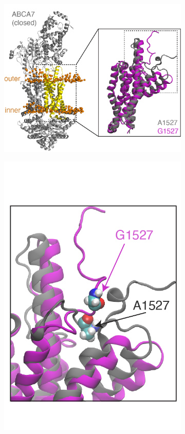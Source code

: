 \begin{figure}[H]
\begin{subfigure}[t]{0.3\textwidth}
        \includegraphics[width=\textwidth]{./main_plots/abca7_structure_with_inset.png}        
    \end{subfigure}
    \begin{subfigure}[t]{0.165\textwidth}
        \caption{}
        \includegraphics[width=\textwidth]{./main_plots/abca7_inset_only.png}        

\end{subfigure}
\end{figure}
